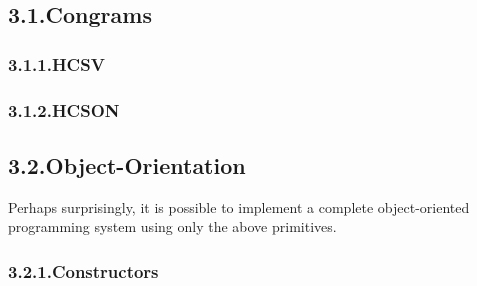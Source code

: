 \documentclass[preprint]{{sigplanconf}}
\begin{document}
\subsection{3.1.\hspace*{0.5em}Congrams}\label{sec-congrams}%

\subsubsection{3.1.1.\hspace*{0.5em}HCSV}\label{sec-hcsv}%

\subsubsection{3.1.2.\hspace*{0.5em}HCSON}\label{sec-hcson}%

\subsection{3.2.\hspace*{0.5em}Object-Orientation}\label{sec-object-orientation}%

\noindent{}Perhaps surprisingly, it is possible to implement a complete object-oriented
programming system using only the above primitives.%

\subsubsection{3.2.1.\hspace*{0.5em}Constructors}\label{sec-constructors}%
\end{document}
